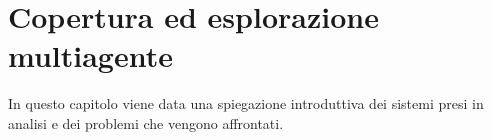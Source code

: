 \chapter{Copertura ed esplorazione multiagente} \label{ch:cov_expl_multiagent}
In questo capitolo viene data una spiegazione introduttiva dei sistemi presi in analisi e dei problemi che vengono affrontati.
